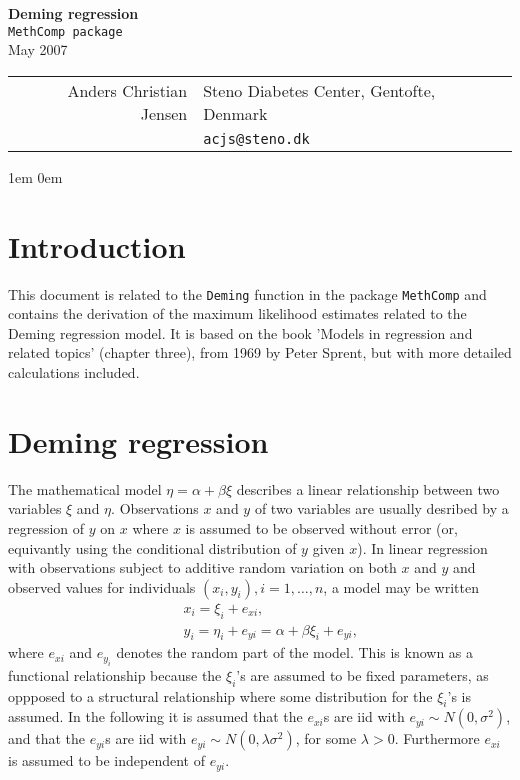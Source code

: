 \documentclass[a4paper,twoside,12pt]{article}
\begin{document}
\raggedleft
\pagestyle{empty}
\Huge
{\bf Deming regression}\\[3mm]
\large
\texttt{MethComp package}\\[1em]
May 2007
\small
\vfill
\noindent
\raggedleft
\begin{tabular}{rl}
Anders Christian Jensen
  & Steno Diabetes Center, Gentofte, Denmark\\
  & \texttt{acjs@steno.dk}
\end{tabular}\hfill
\normalsize
\newpage
\tableofcontents
\newpage
\raggedright
\parindent 1em
\parskip 0em
\pagestyle{fancy}
\renewcommand{\sectionmark}[1]{\markboth{\thesection #1}{\thesection \ #1}}
\fancyhead[ER]{\sl \rightmark}
\fancyhead[EL,OR]{\bf \thepage}
\fancyfoot{}
\renewcommand{\headrulewidth}{0.1pt}
\setcounter{tocdepth}{3}
\setcounter{page}{1}
\section{Introduction}
This document is related to the \texttt{Deming} function in the
package \texttt{MethComp} and contains the derivation of the maximum
likelihood estimates related to the Deming regression model. It is
based on the book 'Models in regression and related topics' (chapter
three), from 1969 by Peter Sprent, but with more detailed calculations
included.
\section{Deming regression}
The mathematical model $\eta=\alpha+\beta\xi$ describes a linear
relationship between two variables $\xi$ and $\eta$. Observations $x$
and $y$ of two variables are usually desribed by a regression of $y$
on $x$ where $x$ is assumed to be observed without error (or,
equivantly using the conditional distribution of $y$ given $x$). In
linear regression with observations subject to additive random
variation on both $x$ and $y$ and observed values for individuals
$(x_i,y_i), i=1,\ldots,n$, a model may be written
\begin{eqnarray*}
  &&x_i=\xi_i+e_{xi},\\[1em]
&&y_i=\eta_i+e_{yi}=\alpha+\beta\xi_i+e_{yi},
\end{eqnarray*}
where $e_{xi}$ and $e_{y_i}$ denotes the random part of the model.
This is known as a functional relationship because the $\xi_i$'s are
assumed to be fixed parameters, as oppposed to a structural
relationship where some distribution for the $\xi_i$'s is assumed. In
the following it is assumed that the $e_{xi}$s are iid with
$e_{yi}\sim N(0,\sigma^2)$, and that the $e_{yi}$s are iid with
$e_{yi} \sim N(0,\lambda\sigma^2)$, for some $\lambda>0$. Furthermore
$e_{xi}$ is assumed to be independent of $e_{yi}$.
\end{document}
